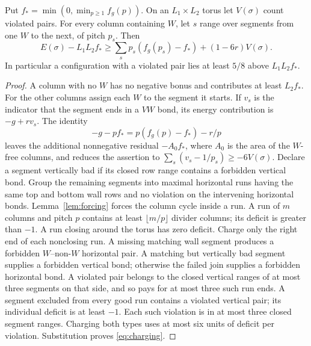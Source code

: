 \begin{lemma}\label{lem:charging}
Put $f_* =\min(0,\min_{p\geq1} f_g(p))$. On an $L_1\times L_2$
torus let $V(\sigma)$ count violated pairs. For every column containing
$W$, let $s$ range over segments from one $W$ to the next, of pitch
$p_s$. Then
\begin{equation}\label{eq:charging}
 E(\sigma)-L_1L_2f_*
 \geq\sum_s p_s(f_g(p_s)-f_*)+(1-6r)V(\sigma).
\end{equation}
In particular a configuration with a violated pair lies at least $5/8$
above $L_1L_2f_*$.
\end{lemma}
\begin{proof}
A column with no $W$ has no negative bonus and contributes at least
$L_2f_*$. For the other columns assign each $W$ to the segment it starts.
If $v_s$ is the indicator that the segment ends in a $VW$ bond, its
energy contribution is $-g+rv_s$. The identity
\[
 -g-pf_*=p(f_g(p)-f_*)-r/p
\]
leaves the additional nonnegative residual $-A_0f_*$, where $A_0$
is the area of the $W$-free columns, and reduces the assertion to
$\sum_s(v_s-1/p_s)\geq-6V(\sigma)$.
Declare a segment vertically bad if its closed row range contains a
forbidden vertical bond. Group the remaining segments into maximal
horizontal runs having the same top and bottom wall rows and no
violation on the intervening horizontal bonds. Lemma~\ref{lem:forcing}
forces the column cycle inside a run. A run of $m$ columns and pitch
$p$ contains at least $\lfloor m/p\rfloor$ divider columns; its deficit
is greater than $-1$. A run closing around the torus has zero deficit.
Charge only the right end of each nonclosing run. A missing matching
wall segment produces a forbidden $W$--non-$W$ horizontal pair.
A matching but vertically bad segment supplies a forbidden vertical
bond; otherwise the failed join supplies a forbidden horizontal bond.
A violated pair belongs to the closed vertical ranges of at most three
segments on that side, and so pays for at most three such run ends.
A segment excluded from every good run contains a violated vertical
pair; its individual deficit is at least $-1$. Each such violation is
in at most three closed segment ranges. Charging both types uses at
most six units of deficit per violation. Substitution proves
\eqref{eq:charging}.
\end{proof}

